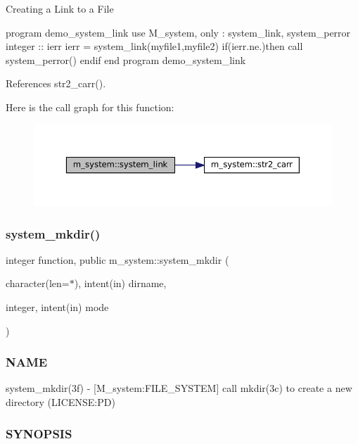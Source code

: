 Creating a Link to a File

program demo\+\_\+system\+\_\+link use M\+\_\+system, only \+: system\+\_\+link, system\+\_\+perror integer \+:\+: ierr ierr = system\+\_\+link(\textquotesingle{}myfile1\textquotesingle{},\textquotesingle{}myfile2\textquotesingle{}) if(ierr.\+ne.)then call system\+\_\+perror(\textquotesingle{}) endif end program demo\+\_\+system\+\_\+link 

References str2\+\_\+carr().

Here is the call graph for this function\+:\nopagebreak
\begin{figure}[H]
\begin{center}
\leavevmode
\includegraphics[width=350pt]{namespacem__system_a0e04b5499fc3367eda9758b6e396a103_cgraph}
\end{center}
\end{figure}
\mbox{\label{namespacem__system_a084d644c236d22af2cc75c6e48fd6e96}} 
\subsubsection{\texorpdfstring{system\+\_\+mkdir()}{system\_mkdir()}}
{\footnotesize\ttfamily integer function, public m\+\_\+system\+::system\+\_\+mkdir (\begin{DoxyParamCaption}\item[{character(len=$\ast$), intent(in)}]{dirname,  }\item[{integer, intent(in)}]{mode }\end{DoxyParamCaption})}



\subsubsection*{N\+A\+ME}

system\+\_\+mkdir(3f) -\/ \mbox{[}M\+\_\+system\+:F\+I\+L\+E\+\_\+\+S\+Y\+S\+T\+EM\mbox{]} call mkdir(3c) to create a new directory (L\+I\+C\+E\+N\+SE\+:PD) \subsubsection*{S\+Y\+N\+O\+P\+S\+IS}

